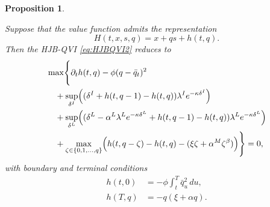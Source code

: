 \documentclass[12pt]{article}
\newtheorem{proposition}[thm]{Proposition}
\begin{document}
\begin{proposition}
\label{prop:reduction}

Suppose that the value function admits the representation
\[
H(t,x,s,q)
=
x+qs+h(t,q).
\]
Then the HJB-QVI \eqref{eq:HJBQVI2}
reduces to
\begin{align}
&\max\Biggl\{
\partial_t h(t,q)
-
\phi(q-\bar q_t)^2
\nonumber\\
&\quad+
\sup_{\delta^I}
\Bigl(
(\delta^I+h(t,q-1)-h(t,q))
\lambda^I e^{-\kappa\delta^I}
\Bigr)
\nonumber\\
&\quad+
\sup_{\delta^L}
\Bigl(
(\delta^L
-\alpha^L\lambda^L e^{-\kappa\delta^L}
+h(t,q-1)-h(t,q))
\lambda^L e^{-\kappa\delta^L}
\Bigr)
\nonumber\\
&\quad+
\max_{\zeta\in\{0,1,\ldots,q\}}
\Bigl(
h(t,q-\zeta)-h(t,q)
-(\xi\zeta+\alpha^M\zeta^\beta)
\Bigr)
\Biggr\}
=
0,
\label{eq:h1}
\end{align}
with boundary and terminal conditions
\begin{align*}
h(t,0)
&=
-\phi\int_t^T\bar q_u^2\,du,
\\
h(T,q)
&=
-q(\xi+\alpha q).
\end{align*}
\end{proposition}
\end{document}
